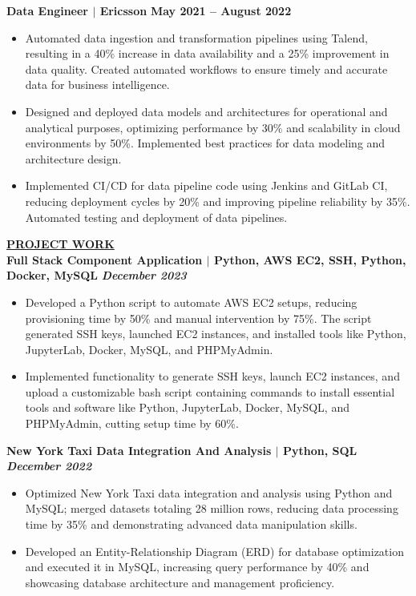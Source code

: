 \documentclass{article}
\begin{document}
\noindent \textbf{Data Engineer $\mid$ Ericsson} \hfill \textbf{May 2021 – August 2022}
\begin{itemize}[noitemsep,nolistsep,leftmargin=*]
\item {\small Automated data ingestion and transformation pipelines using Talend, resulting in a 40\% increase in data availability and a 25\% improvement in data quality. Created automated workflows to ensure timely and accurate data for business intelligence.}
\item {\small Designed and deployed data models and architectures for operational and analytical purposes, optimizing performance by 30\% and scalability in cloud environments by 50\%. Implemented best practices for data modeling and architecture design.}
\item {\small Implemented CI/CD for data pipeline code using Jenkins and GitLab CI, reducing deployment cycles by 20\% and improving pipeline reliability by 35\%. Automated testing and deployment of data pipelines.}
\end{itemize}





\vspace{2mm}
\noindent \textbf{\underline{PROJECT WORK}}\\
\noindent \textbf{Full Stack Component Application $\mid$ Python, AWS EC2, SSH, Python, Docker, MySQL} \textit{\hfill \textbf{December 2023}}
\begin{itemize}[noitemsep,nolistsep,leftmargin=*]
\item {\small Developed a Python script to automate AWS EC2 setups, reducing provisioning time by 50\% and manual intervention by 75\%. The script generated SSH keys, launched EC2 instances, and installed tools like Python, JupyterLab, Docker, MySQL, and PHPMyAdmin.}
\item {\small Implemented functionality to generate SSH keys, launch EC2 instances, and upload a customizable bash script containing commands to install essential tools and software like Python, JupyterLab, Docker, MySQL, and PHPMyAdmin, cutting setup time by 60\%.}
\end{itemize}
\vspace{1mm}

\noindent \textbf{New York Taxi Data Integration And Analysis $\mid$ Python, SQL} \textit{\hfill \textbf{December 2022}}
\begin{itemize}[noitemsep,nolistsep,leftmargin=*]
\item {\small Optimized New York Taxi data integration and analysis using Python and MySQL; merged datasets totaling 28 million rows, reducing data processing time by 35\% and demonstrating advanced data manipulation skills.}
\item {\small Developed an Entity-Relationship Diagram (ERD) for database optimization and executed it in MySQL, increasing query performance by 40\% and showcasing database architecture and management proficiency.}
\end{itemize}
\vspace{1mm}
\end{document}
